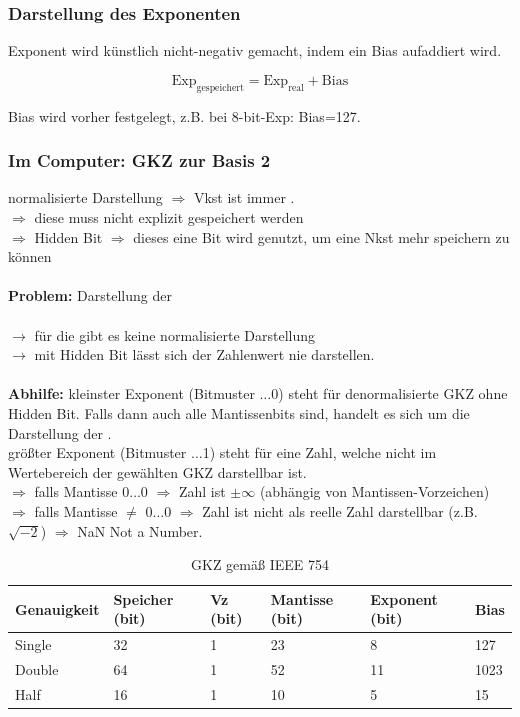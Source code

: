 \documentclass[10pt,a4paper]{scrartcl}
\begin{document}
\subsubsection*{Darstellung des Exponenten}
Exponent wird \glqq künstlich\grqq{} nicht-negativ gemacht, indem ein Bias aufaddiert wird.

$$
\text{Exp}_{\text{gespeichert}} = \text{Exp}_{\text{real}} + \text{Bias}
$$

Bias wird vorher festgelegt, z.B. bei 8-bit-Exp: Bias=127.

\subsubsection*{Im Computer: \ac{GKZ} zur Basis 2}
normalisierte Darstellung $ \Rightarrow $ Vkst ist immer \grqq.\\
$ \Rightarrow $ diese \grqq{} muss nicht explizit gespeichert werden\\
$ \Rightarrow $ \glqq Hidden Bit\grqq
$ \Rightarrow $ dieses eine Bit wird genutzt, um eine Nkst mehr speichern zu können\\
\\
\indent \textbf{Problem:} Darstellung der \grqq{} 
\\\\
$ \rightarrow $ für die \grqq{} gibt es keine normalisierte Darstellung\\
$ \rightarrow $ mit \glqq Hidden Bit\grqq{} lässt sich der Zahlenwert \grqq{} nie darstellen.
\\\\
\textbf{Abhilfe:} kleinster Exponent (Bitmuster $\ldots$0\grqq) steht für denormalisierte \ac{GKZ} ohne Hidden Bit. Falls dann auch alle Mantissenbits \grqq{} sind, handelt es sich um die Darstellung der \grqq.\\
größter Exponent (Bitmuster $\ldots$1\grqq) steht für eine Zahl, welche nicht im Wertebereich der gewählten \ac{GKZ} darstellbar ist.\\
\indent $\Rightarrow$ falls Mantisse \glqq $0 \ldots 0$\grqq{} $\Rightarrow$ Zahl ist $\pm \infty$ (abhängig von Mantissen-Vorzeichen)\\
\indent $\Rightarrow$ falls Mantisse $\neq$ \glqq$0 \ldots 0$\grqq{} $\Rightarrow$ Zahl ist nicht als reelle Zahl darstellbar (z.B. $ \sqrt{-2} $) $\Rightarrow$ NaN \glqq Not a Number\grqq.\\

\begin{table}[h]
	\centering
	\begin{tabular}{l|l|l|l|l|l}
		Genauigkeit & Speicher (bit) & Vz (bit) & Mantisse (bit) & Exponent (bit) & Bias \\ \hline
		Single & 32 & 1 & 23 & 8 & 127\\
		Double & 64 & 1 & 52 & 11 & 1023 \\
		Half & 16 & 1 & 10 & 5 & 15\\
	\end{tabular}
\caption{\acl{GKZ} gemäß IEEE 754}
\end{table}
\end{document}
